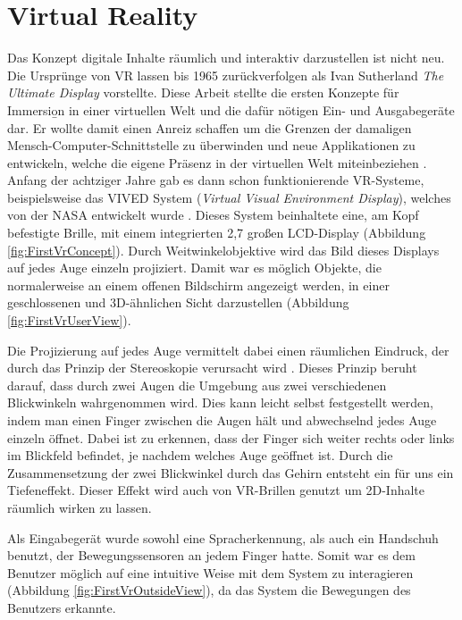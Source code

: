 \section{Virtual Reality}
\label{sec:VirtualReality}

Das Konzept digitale Inhalte räumlich und interaktiv darzustellen ist nicht neu. Die Ursprünge von VR lassen bis 1965 zurückverfolgen als Ivan Sutherland \glqq \textit{The Ultimate Display}\grqq \cite{bib:UltimateDisplay} vorstellte. Diese Arbeit stellte die ersten Konzepte für Immersio̱n in einer virtuellen Welt und die dafür nötigen Ein- und Ausgabegeräte dar. Er wollte damit einen Anreiz schaffen um die Grenzen der damaligen Mensch-Computer-Schnittstelle zu überwinden und neue Applikationen zu entwickeln, welche die eigene Präsenz in der virtuellen Welt miteinbeziehen \cite{bib:VRReport}.\\

Anfang der achtziger Jahre gab es dann schon funktionierende VR-Systeme, beispielsweise das VIVED System (\textit{Virtual Visual Environment Display}), welches von der NASA entwickelt wurde \cite{bib:NasaVr}. Dieses System beinhaltete eine, am Kopf befestigte Brille, mit einem integrierten 2,7\dq{} großen LCD-Display (Abbildung \ref{fig:FirstVrConcept}). Durch Weitwinkelobjektive wird das Bild dieses Displays auf jedes Auge einzeln projiziert. Damit war es möglich Objekte, die normalerweise an einem offenen Bildschirm angezeigt werden, in einer geschlossenen und 3D-ähnlichen Sicht darzustellen (Abbildung \ref{fig:FirstVrUserView}). 

Die Projizierung auf jedes Auge vermittelt dabei einen räumlichen Eindruck, der durch das Prinzip der Stereoskopie verursacht wird \cite{bib:Stereoscopy}. Dieses Prinzip beruht darauf, dass durch zwei Augen die Umgebung aus zwei verschiedenen Blickwinkeln wahrgenommen wird. Dies kann leicht selbst festgestellt werden, indem man einen Finger zwischen die Augen hält und abwechselnd jedes Auge einzeln öffnet. Dabei ist zu erkennen, dass der Finger sich weiter rechts oder links im Blickfeld befindet, je nachdem welches Auge geöffnet ist. Durch die Zusammensetzung der zwei Blickwinkel durch das Gehirn entsteht ein für uns ein Tiefeneffekt. Dieser Effekt wird auch von VR-Brillen genutzt um 2D-Inhalte räumlich wirken zu lassen.

Als Eingabegerät wurde sowohl eine Spracherkennung, als auch ein Handschuh benutzt, der Bewegungssensoren an jedem Finger hatte. Somit war es dem Benutzer möglich auf eine intuitive Weise mit dem System zu interagieren (Abbildung \ref{fig:FirstVrOutsideView}), da das System die Bewegungen des Benutzers erkannte.\\

